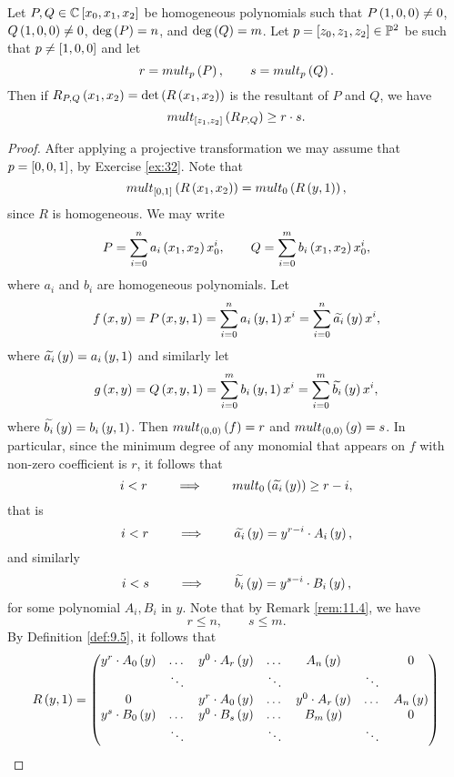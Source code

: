 \begin{lemma}
\label{lem:11.7}
Let $ P, Q \in \C\sb{x_0, x_1, x_2} $ be homogeneous polynomials such that $ P\rb{1, 0, 0} \ne 0 $, $ Q\rb{1, 0, 0} \ne 0 $, $ \deg\rb{P} = n $, and $ \deg\rb{Q} = m $. Let $ p = \sb{z_0, z_1, z_2} \in \P^2 $ be such that $ p \ne \sb{1, 0, 0} $ and let
$$ r = mult_p\rb{P}, \qquad s = mult_p\rb{Q}. $$
Then if $ R_{P, Q}\rb{x_1, x_2} = \det\rb{R\rb{x_1, x_2}} $ is the resultant of $ P $ and $ Q $, we have
$$ mult_{\sb{z_1, z_2}}\rb{R_{P, Q}} \ge r \cdot s. $$
\end{lemma}

\begin{proof}
After applying a projective transformation we may assume that $ p = \sb{0, 0, 1} $, by Exercise \ref{ex:32}. Note that
$$ mult_{\sb{0, 1}}\rb{R\rb{x_1, x_2}} = mult_0\rb{R\rb{y, 1}}, $$
since $ R $ is homogeneous. We may write
$$ P = \sum_{i = 0}^n a_i\rb{x_1, x_2}x_0^i, \qquad Q = \sum_{i = 0}^m b_i\rb{x_1, x_2}x_0^i, $$
where $ a_i $ and $ b_i $ are homogeneous polynomials. Let
$$ f\rb{x, y} = P\rb{x, y, 1} = \sum_{i = 0}^n a_i\rb{y, 1}x^i = \sum_{i = 0}^n \widetilde{a_i}\rb{y}x^i, $$
where $ \widetilde{a_i}\rb{y} = a_i\rb{y, 1} $ and similarly let
$$ g\rb{x, y} = Q\rb{x, y, 1} = \sum_{i = 0}^m b_i\rb{y, 1}x^i = \sum_{i = 0}^m \widetilde{b_i}\rb{y}x^i, $$
where $ \widetilde{b_i}\rb{y} = b_i\rb{y, 1} $. Then $ mult_{\rb{0, 0}}\rb{f} = r $ and $ mult_{\rb{0, 0}}\rb{g} = s $. In particular, since the minimum degree of any monomial that appears on $ f $ with non-zero coefficient is $ r $, it follows that
$$ i < r \qquad \implies \qquad mult_0\rb{\widetilde{a_i}\rb{y}} \ge r - i, $$
that is
$$ i < r \qquad \implies \qquad \widetilde{a_i}\rb{y} = y^{r - i} \cdot A_i\rb{y}, $$
and similarly
$$ i < s \qquad \implies \qquad \widetilde{b_i}\rb{y} = y^{s - i} \cdot B_i\rb{y}, $$
for some polynomial $ A_i, B_i $ in $ y $. Note that by Remark \ref{rem:11.4}, we have
$$ r \le n, \qquad s \le m. $$
By Definition \ref{def:9.5}, it follows that
$$ R\rb{y, 1} =
\begin{pmatrix}
y^r \cdot A_0\rb{y} & \dots & y^0 \cdot A_r\rb{y} & \dots & A_n\rb{y} & & 0 \\
& \ddots & & \ddots & & \ddots & \\
0 & & y^r \cdot A_0\rb{y} & \dots & y^0 \cdot A_r\rb{y} & \dots & A_n\rb{y} \\
y^s \cdot B_0\rb{y} & \dots & y^0 \cdot B_s\rb{y} & \dots & B_m\rb{y} & & 0 \\
& \ddots & & \ddots & & \ddots & \\

\end{pmatrix}$$
\end{proof}
